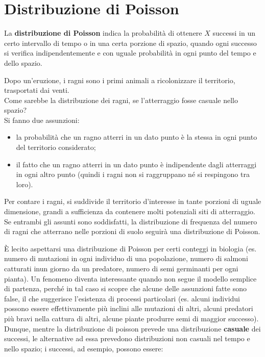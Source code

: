 \documentclass[10pt, draft]{book}
\newcommand{\tightlist}{%
\setlength{\itemsep}{1pt}\setlength{\parskip}{0pt}\setlength{\parsep}{0pt}}
\newcounter{example}[section]
\begin{document}
\section{Distribuzione di Poisson}

La \textbf{distribuzione di Poisson} indica la probabilità di ottenere $X$ successi in un certo intervallo di tempo o in una certa porzione di spazio, quando ogni successo si verifica indipendentemente e con uguale probabilità in ogni punto del tempo e dello spazio.

\begin{example}
Dopo un'eruzione, i ragni sono i primi animali a ricolonizzare il territorio, trasportati dai venti.
\\
Come sarebbe la distribuzione dei ragni, se l'atterraggio fosse casuale nello spazio?
\\
Si fanno due assunzioni:
\begin{itemize} \tightlist
    \item la probabilità che un ragno atterri in un dato punto è la stessa in ogni punto del territorio considerato;
    \item il fatto che un ragno atterri in un dato punto è indipendente dagli atterraggi in ogni altro punto (quindi i ragni non si raggruppano né si respingono tra loro).
\end{itemize}
Per contare i ragni, si suddivide il territorio d'interesse in tante porzioni di uguale dimensione, grandi a sufficienza da contenere molti potenziali siti di atterraggio.
\\
Se entrambi gli assunti sono soddisfatti, la distribuzione di frequenza del numero di ragni che atterrano nelle porzioni di suolo seguirà una distribuzione di Poisson.
\end{example}
È lecito aspettarsi una distribuzione di Poisson per certi conteggi in biologia (es. numero di mutazioni in ogni individuo di una popolazione, numero di salmoni catturati inun giorno da un predatore, numero di semi germinanti per ogni pianta). Un fenomeno diventa interessante quando non segue il modello semplice di partenza, perché in tal caso si scopre che alcune delle assunzioni fatte sono false, il che suggerisce l'esistenza di processi particolari (es. alcuni individui possono essere effettivamente più inclini alle mutazioni di altri, alcuni predatori più bravi nella cattura di altri, alcune piante produrre semi di maggior successo).
\\
Dunque, mentre la distribuzione di poisson prevede una distribuzione \textbf{casuale} dei successi, le alternative ad essa prevedono distribuzioni non casuali nel tempo e nello spazio; i successi, ad esempio, possono essere:
\end{document}
